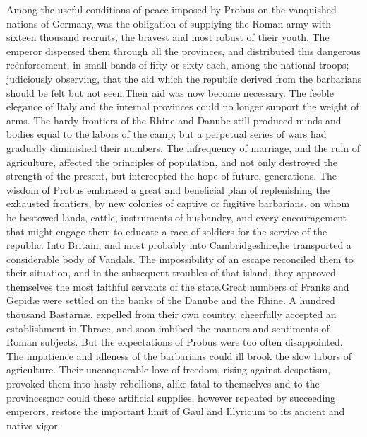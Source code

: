 Among the useful conditions of peace imposed by Probus on the
vanquished nations of Germany, was the obligation of supplying
the Roman army with sixteen thousand recruits, the bravest and
most robust of their youth. The emperor dispersed them through
all the provinces, and distributed this dangerous reënforcement,
in small bands of fifty or sixty each, among the national troops;
judiciously observing, that the aid which the republic derived
from the barbarians should be felt but not seen.\footnotemark[45] Their aid was
now become necessary. The feeble elegance of Italy and the
internal provinces could no longer support the weight of arms.
The hardy frontiers of the Rhine and Danube still produced minds
and bodies equal to the labors of the camp; but a perpetual
series of wars had gradually diminished their numbers. The
infrequency of marriage, and the ruin of agriculture, affected
the principles of population, and not only destroyed the strength
of the present, but intercepted the hope of future, generations.
The wisdom of Probus embraced a great and beneficial plan of
replenishing the exhausted frontiers, by new colonies of captive
or fugitive barbarians, on whom he bestowed lands, cattle,
instruments of husbandry, and every encouragement that might
engage them to educate a race of soldiers for the service of the
republic. Into Britain, and most probably into Cambridgeshire,\footnotemark[46]
he transported a considerable body of Vandals. The impossibility
of an escape reconciled them to their situation, and in the
subsequent troubles of that island, they approved themselves the
most faithful servants of the state.\footnotemark[47] Great numbers of Franks
and Gepidæ were settled on the banks of the Danube and the Rhine.
A hundred thousand Bastarnæ, expelled from their own country,
cheerfully accepted an establishment in Thrace, and soon imbibed
the manners and sentiments of Roman subjects. \footnotemark[48] But the
expectations of Probus were too often disappointed. The
impatience and idleness of the barbarians could ill brook the
slow labors of agriculture. Their unconquerable love of freedom,
rising against despotism, provoked them into hasty rebellions,
alike fatal to themselves and to the provinces;\footnotemark[49] nor could
these artificial supplies, however repeated by succeeding
emperors, restore the important limit of Gaul and Illyricum to
its ancient and native vigor.


